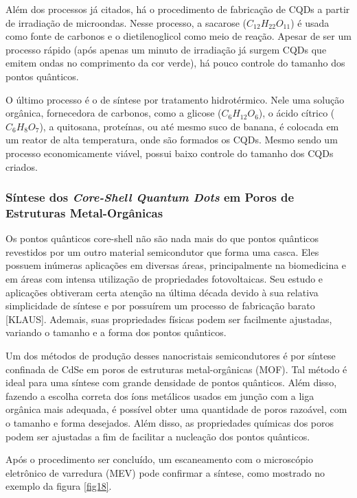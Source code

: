 \par Além dos processos já citados, há o procedimento de fabricação de CQDs a partir de irradiação de microondas. Nesse processo, a sacarose ($C_{12}H_{22}O_{11}$) é usada como fonte de carbonos e o dietilenoglicol como meio de reação. Apesar de ser um processo rápido (após apenas um minuto de irradiação já surgem CQDs que emitem ondas no comprimento da cor verde), há pouco controle do tamanho dos pontos quânticos.

\par O último processo é o de síntese por tratamento hidrotérmico. Nele uma solução orgânica, fornecedora de carbonos, como a glicose ($C_{6}H_{12}O_{6}$), o ácido cítrico ($C_{6}H_{8}O_{7}$), a quitosana, proteínas, ou até mesmo suco de banana, é colocada em um reator de alta temperatura, onde são formados os CQDs. Mesmo sendo um processo economicamente viável, possui baixo controle do tamanho dos CQDs criados.

\subsubsection{Síntese dos \textit{Core-Shell Quantum Dots} em Poros de Estruturas Metal-Orgânicas}

	\par Os pontos quânticos core-shell não são nada mais do que pontos quânticos revestidos por um outro material semicondutor que forma uma casca. Eles possuem inúmeras aplicações em diversas áreas, principalmente na biomedicina e em áreas com intensa utilização de propriedades fotovoltaicas. Seu estudo e aplicações obtiveram certa atenção na última década devido à sua relativa simplicidade de síntese e por possuírem um processo de fabricação barato [KLAUS]. Ademais, suas propriedades físicas podem ser facilmente ajustadas, variando o tamanho e a forma dos pontos quânticos.

	\par Um dos métodos de produção desses nanocristais semicondutores é por síntese confinada de CdSe em poros de estruturas metal-orgânicas (MOF)\cite{sintese3}. Tal método é ideal para uma síntese com grande densidade de pontos quânticos. Além disso, fazendo a escolha correta dos íons metálicos usados em junção com a liga orgânica mais adequada, é possível obter uma quantidade de poros razoável, com o tamanho e forma desejados. Além disso, as propriedades químicas dos poros podem ser ajustadas a fim de facilitar a nucleação dos pontos quânticos.

	\par Após o procedimento ser concluído, um escaneamento com o microscópio eletrônico de varredura (MEV) pode confirmar a síntese, como mostrado no exemplo da figura \ref{fig18}.

